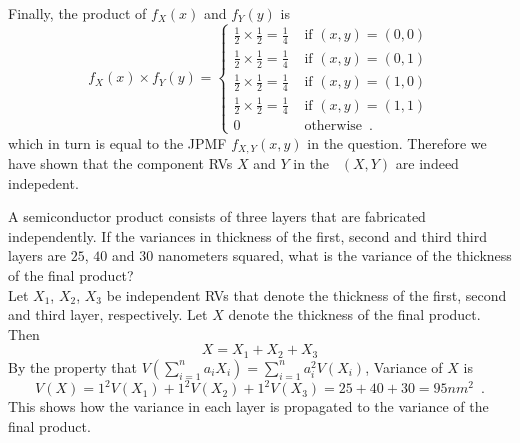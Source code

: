 \begin{ExerciseList}
\[\]
Finally, the product of $f_X(x)$ and $f_Y(y)$ is
\[
f_{X}(x) \times f_{Y}(y) = 
\begin{cases}
\frac{1}{2} \times \frac{1}{2}=\frac{1}{4} & \text{ if } (x,y)=(0,0)\\
\frac{1}{2} \times \frac{1}{2}=\frac{1}{4} & \text{ if } (x,y)=(0,1)\\
\frac{1}{2} \times \frac{1}{2}=\frac{1}{4} & \text{ if } (x,y)=(1,0)\\
\frac{1}{2} \times \frac{1}{2}=\frac{1}{4} & \text{ if } (x,y)=(1,1)\\
0 & \text{ otherwise} \enspace .
\end{cases}
\]
which in turn is equal to the JPMF $f_{X,Y}(x,y)$ in the question.  Therefore we have shown that the component RVs $X$ and $Y$ in the \rv~$(X,Y)$ are indeed indepedent.

\Exercise
A semiconductor product consists of three layers that are fabricated independently.  
If the variances in thickness of the first, second and third third layers are $25$, $40$ and $30$ nanometers squared, what is the variance of the thickness of the final product? 
\Answer
~\\
Let $X_1$, $X_2$, $X_3$ be independent RVs that denote the thickness of the first, second and third layer, respectively.  Let $X$ denote the thickness of the final product.  Then
\[
X= X_1+X_2+X_3
\]
By the property that $V\left(\sum_{i=1}^n a_i X_i\right) = \sum_{i=1}^n a_i^2 V(X_i)$, Variance of $X$ is
\[
V(X) = 1^2 V(X_1) + 1^2 V(X_2) + 1^2 V(X_3) = 25+40+30 = 95 nm^2 \enspace .
\] 
This shows how the variance in each layer is propagated to the variance of the final product.


\end{ExerciseList}
